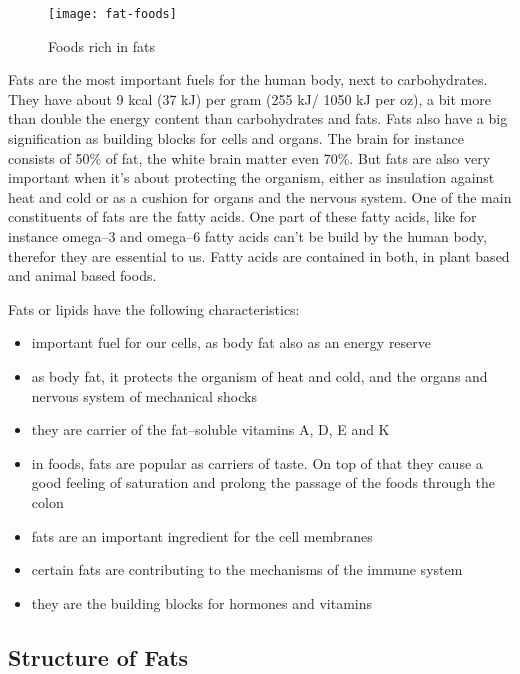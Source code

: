 \documentclass[../main.tex]{subfiles}
\begin{document}
\begin{figure}[htb!]
\centering
  \texttt{[image: fat-foods]}
  \caption{Foods rich in fats~\cite{FatFoods}}
\end{figure}

Fats are the most important fuels for the human body, next to carbohydrates.
They have about 9 kcal (37 kJ) per gram (255 kJ/ 1050 kJ per oz), a bit more than double the energy content than carbohydrates and fats.
Fats also have a big signification as building blocks for cells and organs.
The brain for instance consists of 50\% of fat, the white brain matter even 70\%.
But fats are also very important when it's about protecting the organism,
either as insulation against heat and cold or as a cushion for organs and the nervous system.
One of the main constituents of fats are the fatty acids.
One part of these fatty acids, like for instance omega--3 and omega--6 fatty acids
can't be build by the human body, therefor they are essential to us.
Fatty acids are contained in both, in plant based and animal based foods.

Fats or lipids have the following characteristics:
\begin{itemize}
\item important fuel for our cells, as body fat also as an energy reserve
\item as body fat, it protects the organism of heat and cold, and the organs and nervous system of mechanical shocks
\item they are carrier of the fat--soluble vitamins A, D, E and K
\item in foods, fats are popular as carriers of taste. On top of that
  they cause a good feeling of saturation and prolong the passage of the foods through the colon
\item fats are an important ingredient for the cell membranes
\item certain fats are contributing to the mechanisms of the immune system
\item they are the building blocks for hormones and vitamins 
\end{itemize}

\subsection{Structure of Fats}
\end{document}
